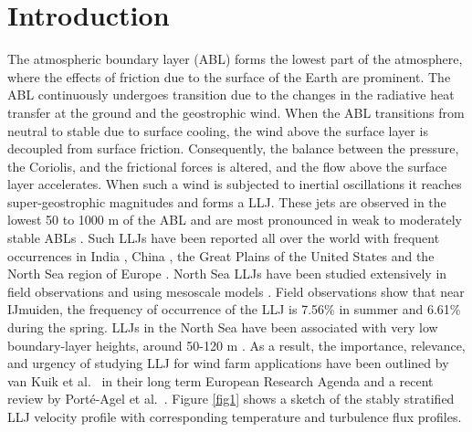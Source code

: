\documentclass[%
 aip,
 amsmath,amssymb,
preprint,%
author-numerical,%
]{revtex4-1}
\begin{document}
\maketitle

\section{Introduction}\label{sec1}


The atmospheric boundary layer (ABL) forms the lowest part of the atmosphere, where the effects of friction due to the surface of the Earth are prominent. The ABL continuously undergoes transition due to the changes in the radiative heat transfer at the ground and the geostrophic wind. When the ABL transitions from neutral to stable due to surface cooling, the wind above the surface layer is decoupled from surface friction. Consequently, the balance between the {\color{black}pressure, the Coriolis, and the frictional forces is altered, and} the flow above the surface layer accelerates. When such a wind is subjected to inertial oscillations it reaches super-geostrophic magnitudes and forms a LLJ. These jets are observed in the lowest 50 to 1000 m of the ABL \citep{sme96} and are most pronounced in weak to moderately stable ABLs \cite{baa09, ban08}. Such LLJs \cite{kel04, ban02, sme93} have been reported all over the world with frequent occurrences in India \cite{pra11}, China \cite{liu14}, the Great Plains of the United States \cite{arr97} and the North Sea region of Europe \cite{kal19, wag19}. North Sea LLJs have been studied extensively in field observations \cite{kal17, dun18} and using mesoscale models \cite{kal19}. Field observations show that near IJmuiden, the frequency of occurrence of the LLJ is 7.56\% in summer and 6.61\% during the spring. LLJs in the North Sea have been associated with very low boundary-layer heights, around 50-120 m \cite{dun18}. As a result, the importance, relevance, and urgency of studying LLJ for wind farm applications have been outlined by van Kuik et al.\ \cite{kui16} in their long term European Research Agenda and a recent review by Port\'e-Agel et al.\ \cite{por20}. Figure \ref{fig1} shows a sketch of the stably stratified LLJ velocity profile with corresponding temperature and turbulence flux profiles.\\
\end{document}
